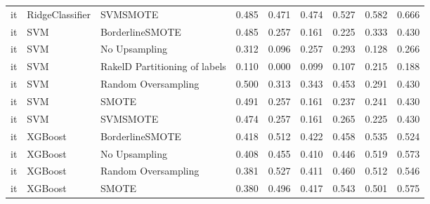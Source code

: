 \begin{tabular}{lllllllll}
      it &                 RidgeClassifier &                      SVMSMOTE & 0.485 &                     0.471 &                 0.474 &                  0.527 &                                   0.582 &     0.666 \\
      it &                             SVM &               BorderlineSMOTE & 0.485 &                     0.257 &                 0.161 &                  0.225 &                                   0.333 &     0.430 \\
      it &                             SVM &                 No Upsampling & 0.312 &                     0.096 &                 0.257 &                  0.293 &                                   0.128 &     0.266 \\
      it &                             SVM & RakelD Partitioning of labels & 0.110 &                     0.000 &                 0.099 &                  0.107 &                                   0.215 &     0.188 \\
      it &                             SVM &           Random Oversampling & 0.500 &                     0.313 &                 0.343 &                  0.453 &                                   0.291 &     0.430 \\
      it &                             SVM &                         SMOTE & 0.491 &                     0.257 &                 0.161 &                  0.237 &                                   0.241 &     0.430 \\
      it &                             SVM &                      SVMSMOTE & 0.474 &                     0.257 &                 0.161 &                  0.265 &                                   0.225 &     0.430 \\
      it &                         XGBoost &               BorderlineSMOTE & 0.418 &                     0.512 &                 0.422 &                  0.458 &                                   0.535 &     0.524 \\
      it &                         XGBoost &                 No Upsampling & 0.408 &                     0.455 &                 0.410 &                  0.446 &                                   0.519 &     0.573 \\
      it &                         XGBoost &           Random Oversampling & 0.381 &                     0.527 &                 0.411 &                  0.460 &                                   0.512 &     0.546 \\
      it &                         XGBoost &                         SMOTE & 0.380 &                     0.496 &                 0.417 &                  0.543 &                                   0.501 &     0.575 \\

\end{tabular}
